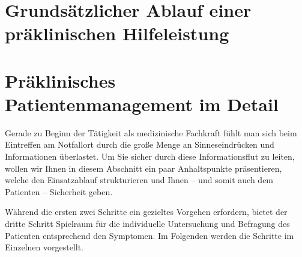 \section{Grundsätzlicher Ablauf einer präklinischen Hilfeleistung}

\section{Präklinisches Patientenmanagement im Detail}

Gerade zu Beginn der Tätigkeit als medizinische Fachkraft
fühlt man sich beim Eintreffen am Notfallort durch die große
Menge an Sinneseindrücken und Informationen überlastet. Um
Sie sicher durch diese Informationsflut zu leiten, wollen
wir Ihnen in diesem Abschnitt ein paar Anhaltspunkte
präsentieren, welche den Einsatzablauf strukturieren und
Ihnen -- und somit auch dem Patienten -- Sicherheit geben.



Während die ersten zwei Schritte ein gezieltes Vorgehen
erfordern, bietet der dritte Schritt Spielraum für die
individuelle Untersuchung und Befragung des Patienten
entsprechend den Symptomen. Im Folgenden werden die Schritte
im Einzelnen vorgestellt.

